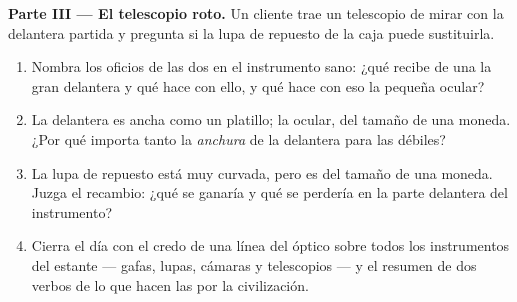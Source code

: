 \begin{problem}
\medskip\noindent\textbf{Parte III --- El telescopio roto.}
Un cliente trae un telescopio de mirar  con la 
delantera partida y pregunta si la lupa de repuesto de la caja puede
sustituirla.
\begin{enumerate}[resume]
  \item Nombra los oficios de las dos  en el instrumento sano:
        ¿qué recibe de una  la gran  delantera
        y qué hace con ello, y qué hace con eso la pequeña
         ocular?
  \item La  delantera es ancha como un platillo; la
         ocular, del tamaño de una moneda. ¿Por qué importa
        tanto la \emph{anchura} de la  delantera para las
         débiles?
  \item La lupa de repuesto está muy curvada, pero es del tamaño de
        una moneda. Juzga el recambio: ¿qué se ganaría y qué se
        perdería en la parte delantera del instrumento?
  \item Cierra el día con el credo de una línea del óptico sobre
        todos los instrumentos del estante --- gafas, lupas, cámaras
        y telescopios --- y el resumen de dos verbos de lo que hacen
        las  por la civilización.
\end{enumerate}
\end{problem}
